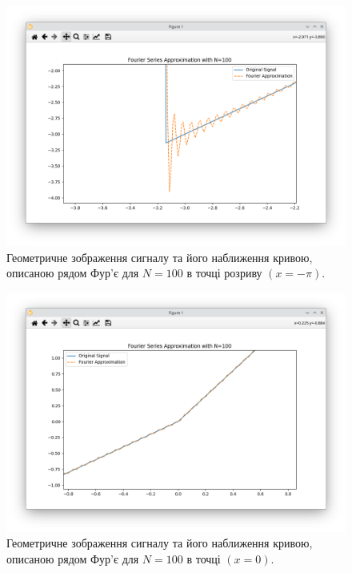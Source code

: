\documentclass[oneside,14pt]{extarticle}
\begin{document}
\begin{normalsize}
	\begin{figure}[H]
		\centering
		\vspace{-30pt}
		\includegraphics[scale=0.58]{3}
		\vspace{-30pt}
		\caption{Геометричне зображення сигналу та його наближення кривою, описаною рядом Фур’є для $N=100$ в точці розриву $(x=-\pi)$.}
	\end{figure}
	
	\begin{figure}[H]
		\centering
		\vspace{-30pt}
		\includegraphics[scale=0.58]{4}
		\vspace{-30pt}
		\caption{Геометричне зображення сигналу та його наближення кривою, описаною рядом Фур’є для $N=100$ в точці $(x=0)$.}
	\end{figure}
	

\end{normalsize}
\end{document}

